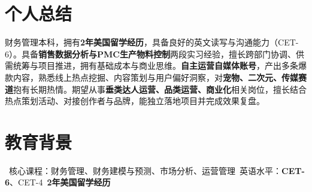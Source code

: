 \documentclass{resume}
\begin{document}



\section{个人总结}
财务管理本科，拥有\textbf{2年美国留学经历}，具备良好的英文读写与沟通能力（CET-6）。具备\textbf{销售数据分析与PMC生产物料控制}两段实习经验，擅长跨部门协调、供需统筹与项目推进，拥有基础成本与商业思维。\textbf{自主运营自媒体账号}，产出多条爆款内容，熟悉线上热点挖掘、内容策划与用户偏好洞察，对\textbf{宠物、二次元、传媒赛道}抱有长期热情。期望从事\textbf{垂类达人运营、品类运营、商业化}相关岗位，擅长结合热点策划活动、对接创作者与品牌，能独立落地项目并完成效果复盘。

\section{教育背景}
\ 核心课程：财务管理、财务建模与预测、市场分析、运营管理\textperiodcentered\ 英语水平：\textbf{CET-6}、CET-4\textperiodcentered\ \textbf{2年美国留学经历}
\end{document}
